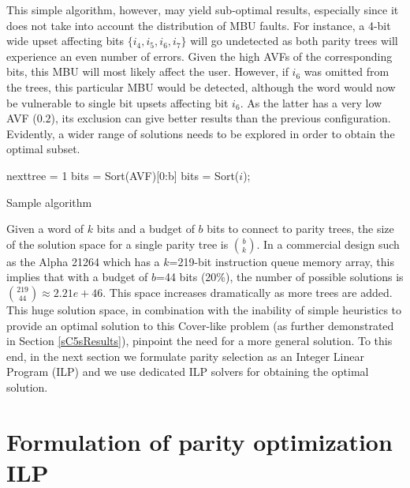 \documentclass[12pt]{yalephd}
\begin{document}
This simple algorithm, however, may yield sub-optimal results, especially since it does not take into account the distribution of MBU faults. For instance, a 4-bit wide upset affecting bits $\{i_4, i_5, i_6, i_7\}$ will go undetected as both parity trees will experience an even number of errors. Given the high AVFs of the corresponding bits, this MBU will most likely affect the user. However, if $i_6$ was omitted from the trees, this particular MBU would be detected, although the word would now be vulnerable to single bit upsets affecting bit $i_6$. As the latter has a very low AVF ($0.2$), its exclusion can give better results than the previous configuration. Evidently, a wider range of solutions needs to be explored in order to obtain the optimal subset.

\begin{algorithm}[!ht]
nexttree = 1\;
bits = Sort(AVF)[0:b]\;
bits = Sort($i$);


\caption{Sample algorithm}
\label{sC5aSample}
\end{algorithm}

Given a word of $k$ bits and a budget of $b$ bits to connect to parity trees, the size of the solution space for a single parity tree is $\binom{b}{k}$. In a commercial design such as the Alpha 21264 which has a $k$=219-bit instruction queue memory array, this implies that with a budget of $b$=44 bits (20\%), the number of possible solutions is $\binom{219}{44} \approx 2.21e+46$. This space increases dramatically as more trees are added. This huge solution space, in combination with the inability of simple heuristics to provide an optimal solution to this Cover-like problem (as further demonstrated in Section \ref{sC5sResults}), pinpoint the need for a more general solution. To this end, in the next section we formulate parity selection as an Integer Linear Program (ILP) and we use dedicated ILP solvers for obtaining the optimal solution.

\section{Formulation of parity optimization ILP}\label{sC5sFormulation}
\end{document}
